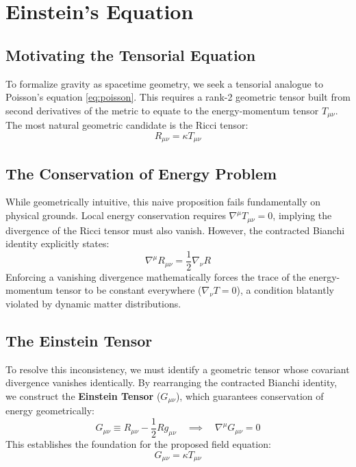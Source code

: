 \documentclass[11pt, a4paper]{report}
\begin{document}
\section{Einstein's Equation}

\subsection{Motivating the Tensorial Equation}
To formalize gravity as spacetime geometry, we seek a tensorial analogue to Poisson's equation \eqref{eq:poisson}. This requires a rank-2 geometric tensor built from second derivatives of the metric to equate to the energy-momentum tensor $T_{\mu\nu}$. The most natural geometric candidate is the Ricci tensor:
\begin{equation}
\label{eq:naive_einstein}
R_{\mu\nu} = \kappa T_{\mu\nu}
\end{equation}

\subsection{The Conservation of Energy Problem}
While geometrically intuitive, this naive proposition fails fundamentally on physical grounds. Local energy conservation requires $\nabla^{\mu}T_{\mu\nu} = 0$, implying the divergence of the Ricci tensor must also vanish. However, the contracted Bianchi identity explicitly states:
\begin{equation}
\label{eq:contracted_bianchi_again}
\nabla^{\mu}R_{\mu\nu} = \frac{1}{2}\nabla_{\nu}R
\end{equation}
Enforcing a vanishing divergence mathematically forces the trace of the energy-momentum tensor to be constant everywhere ($\nabla_{\nu}T = 0$), a condition blatantly violated by dynamic matter distributions.

\subsection{The Einstein Tensor}
To resolve this inconsistency, we must identify a geometric tensor whose covariant divergence vanishes identically. By rearranging the contracted Bianchi identity, we construct the \textbf{Einstein Tensor} ($G_{\mu\nu}$), which guarantees conservation of energy geometrically:
\begin{equation}
\label{eq:einstein_tensor_def}
G_{\mu\nu} \equiv R_{\mu\nu} - \frac{1}{2}R g_{\mu\nu} \quad \implies \quad \nabla^{\mu}G_{\mu\nu} = 0
\end{equation}
This establishes the foundation for the proposed field equation:
\begin{equation}
\label{eq:einstein_proposed}
G_{\mu\nu} = \kappa T_{\mu\nu}
\end{equation}
\end{document}
